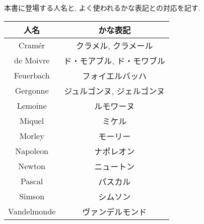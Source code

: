 本書に登場する人名と, よく使われるかな表記との対応を記す.
\begin{center}
\begin{tabular}{c|c}
人名&かな表記\\
\hline
Cram\'er&クラメル, クラメール\\
de Moivre&ド・モアブル, ド・モワブル\\
Feuerbach&フォイエルバッハ\\
Gergonne&ジュルゴンヌ, ジェルゴンヌ\\
Lemoine&ルモワーヌ\\
Miquel&ミケル\\
Morley&モーリー\\
Napoleon&ナポレオン\\
Newton&ニュートン\\
Pascal&パスカル\\
Simson&シムソン\\
Vandelmonde&ヴァンデルモンド
\end{tabular}
\end{center}